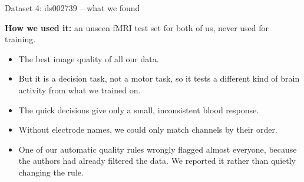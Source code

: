 \documentclass[aspectratio=169,11pt]{beamer}
\begin{document}
\begin{frame}{Dataset 4: ds002739 -- what we found}
\begin{slidebox}
\small
\textbf{How we used it:} an unseen fMRI test set for both of us, never used for training.
\begin{itemize}\setlength{\itemsep}{3pt}
  \item The best image quality of all our data.
  \item But it is a decision task, not a motor task, so it tests a different kind of brain activity from what we trained on.
  \item The quick decisions give only a small, inconsistent blood response.
  \item Without electrode names, we could only match channels by their order.
  \item One of our automatic quality rules wrongly flagged almost everyone, because the authors had already filtered the data. We reported it rather than quietly changing the rule.
\end{itemize}
\end{slidebox}
\end{frame}
\end{document}
